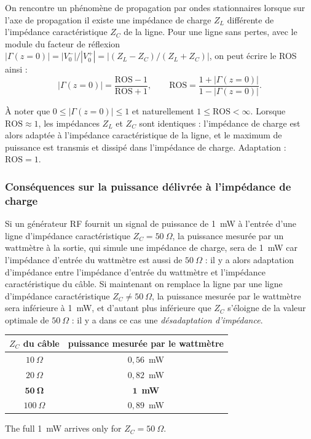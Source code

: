 \begin{theorem}
  On rencontre un phénomène de propagation par ondes stationnaires lorsque sur
  l'axe de propagation il existe une impédance de charge $Z_L$ différente de
  l'impédance caractéristique $Z_C$ de la ligne. Pour une ligne sans pertes,
  avec le module du facteur de réflexion
  $|\Gamma(z=0)| = |V_0^{-}|/|V_0^{+}| = \left|(Z_L-Z_C)/(Z_L+Z_C)\right|$,
  on peut écrire le ROS ainsi :
  \[
    \boxed{\;
    |\Gamma(z=0)| = \frac{\mathrm{ROS} - 1}{\mathrm{ROS} + 1},
    \qquad
    \mathrm{ROS} = \frac{1 + |\Gamma(z=0)|}{1 - |\Gamma(z=0)|} .
    \;}
  \]
\end{theorem}

À noter que $0 \le |\Gamma(z=0)| \le 1$ et naturellement
$1 \le \mathrm{ROS} < \infty$. Lorsque $\mathrm{ROS} \approx 1$, les impédances
$Z_L$ et $Z_C$ sont identiques : l'impédance de charge est alors adaptée à
l'impédance caractéristique de la ligne, et le maximum de puissance est transmis
et dissipé dans l'impédance de charge. Adaptation : $\mathrm{ROS} = 1$.

\subsubsection{Conséquences sur la puissance délivrée à l'impédance de charge}
Si un générateur RF fournit un signal de puissance de 1~mW à l'entrée d'une
ligne d'impédance caractéristique $Z_C = 50\ \Omega$, la puissance mesurée par
un wattmètre à la sortie, qui simule une impédance de charge, sera de 1~mW car
l'impédance d'entrée du wattmètre est aussi de $50\ \Omega$ : il y a alors
adaptation d'impédance entre l'impédance d'entrée du wattmètre et l'impédance
caractéristique du câble. Si maintenant on remplace la ligne par une ligne
d'impédance caractéristique $Z_C \ne 50\ \Omega$, la puissance mesurée par le
wattmètre sera inférieure à 1~mW, et d'autant plus inférieure que $Z_C$
s'éloigne de la valeur optimale de $50\ \Omega$ : il y a dans ce cas une
\emph{désadaptation d'impédance}.

\begin{example}
  \begin{center}
    \begin{tabular}{cc}
      \toprule
      $Z_C$ du câble & puissance mesurée par le wattmètre \\
      \midrule
      $10\ \Omega$  & $0{,}56$~mW \\
      $20\ \Omega$  & $0{,}82$~mW \\
      $\mathbf{50\ \Omega}$  & $\mathbf{1}$~\textbf{mW} \\
      $100\ \Omega$ & $0{,}89$~mW \\
      \bottomrule
    \end{tabular}
  \end{center}
  The full 1~mW arrives only for $Z_C = 50\ \Omega$.
\end{example}


